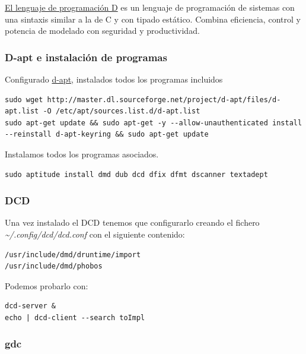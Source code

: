 \documentclass[12pt,spanish,]{scrartcl}
\begin{document}
\href{https://dlang.org/}{El lenguaje de programación D} es un lenguaje
de programación de sistemas con una sintaxis similar a la de C y con
tipado estático. Combina eficiencia, control y potencia de modelado con
seguridad y productividad.

\hypertarget{d-apt-e-instalaciuxf3n-de-programas}{%
\subsubsection{D-apt e instalación de
programas}\label{d-apt-e-instalaciuxf3n-de-programas}}

Configurado \href{http://d-apt.sourceforge.net/}{d-apt}, instalados
todos los programas incluidos

\begin{verbatim}
sudo wget http://master.dl.sourceforge.net/project/d-apt/files/d-apt.list -O /etc/apt/sources.list.d/d-apt.list
sudo apt-get update && sudo apt-get -y --allow-unauthenticated install --reinstall d-apt-keyring && sudo apt-get update
\end{verbatim}

Instalamos todos los programas asociados.

\begin{verbatim}
sudo aptitude install dmd dub dcd dfix dfmt dscanner textadept
\end{verbatim}

\hypertarget{dcd}{%
\subsubsection{DCD}\label{dcd}}

Una vez instalado el DCD tenemos que configurarlo creando el fichero
\emph{\textasciitilde{}/.config/dcd/dcd.conf} con el siguiente
contenido:

\begin{verbatim}
/usr/include/dmd/druntime/import
/usr/include/dmd/phobos
\end{verbatim}

Podemos probarlo con:

\begin{verbatim}
dcd-server &
echo | dcd-client --search toImpl
\end{verbatim}

\hypertarget{gdc}{%
\subsubsection{gdc}\label{gdc}}
\end{document}
